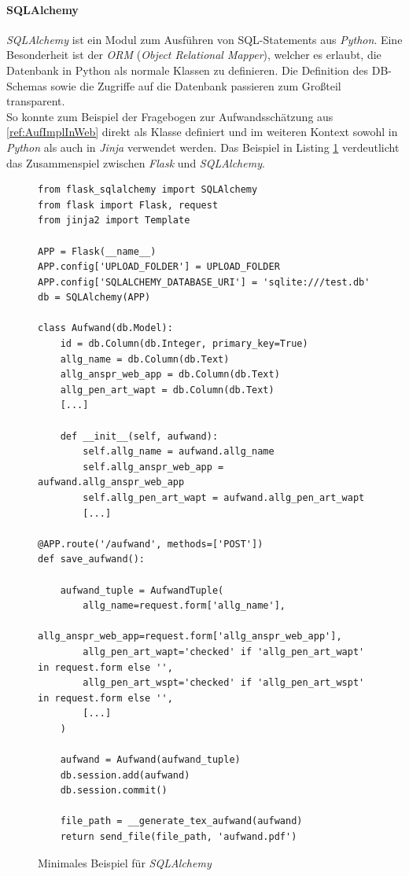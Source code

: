 \paragraph{SQLAlchemy}\label{ref:SQLAlchemy}
\textit{SQLAlchemy} ist ein Modul zum Ausführen von SQL-Statements aus \textit{Python}. Eine Besonderheit ist der \textit{ORM} (\textit{Object Relational Mapper}), welcher es erlaubt, die Datenbank in Python als normale Klassen zu definieren. Die Definition des DB-Schemas sowie die Zugriffe auf die Datenbank passieren zum Großteil transparent.\\

So konnte zum Beispiel der Fragebogen zur Aufwandsschätzung aus \ref{ref:AufImplInWeb} direkt als Klasse definiert und im weiteren Kontext sowohl in \textit{Python} als auch in \textit{Jinja} verwendet werden. Das Beispiel in Listing \ref{lis:PenProzSQLAlchemy} verdeutlicht das Zusammenspiel zwischen \textit{Flask} und \textit{SQLAlchemy}.

\begin{figure}
\lstset{language=Python}
\begin{lstlisting}
from flask_sqlalchemy import SQLAlchemy
from flask import Flask, request
from jinja2 import Template

APP = Flask(__name__)
APP.config['UPLOAD_FOLDER'] = UPLOAD_FOLDER
APP.config['SQLALCHEMY_DATABASE_URI'] = 'sqlite:///test.db'
db = SQLAlchemy(APP)

class Aufwand(db.Model):
    id = db.Column(db.Integer, primary_key=True)
    allg_name = db.Column(db.Text)
    allg_anspr_web_app = db.Column(db.Text)
    allg_pen_art_wapt = db.Column(db.Text)
    [...]

    def __init__(self, aufwand):
        self.allg_name = aufwand.allg_name
        self.allg_anspr_web_app = aufwand.allg_anspr_web_app
        self.allg_pen_art_wapt = aufwand.allg_pen_art_wapt
        [...]
        
@APP.route('/aufwand', methods=['POST'])
def save_aufwand():

    aufwand_tuple = AufwandTuple(
        allg_name=request.form['allg_name'],
        allg_anspr_web_app=request.form['allg_anspr_web_app'],
        allg_pen_art_wapt='checked' if 'allg_pen_art_wapt' in request.form else '',
        allg_pen_art_wspt='checked' if 'allg_pen_art_wspt' in request.form else '',
        [...]
    )

    aufwand = Aufwand(aufwand_tuple)
    db.session.add(aufwand)
    db.session.commit()

    file_path = __generate_tex_aufwand(aufwand)
    return send_file(file_path, 'aufwand.pdf')
\end{lstlisting}
\caption{Minimales Beispiel für \textit{SQLAlchemy}}
\label{lis:PenProzSQLAlchemy}
\end{figure}

